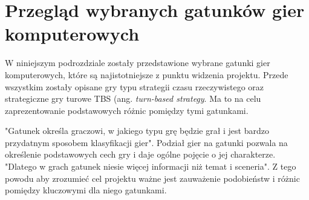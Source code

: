 \section{Przegląd wybranych gatunków gier komputerowych}
W niniejszym podrozdziale zostały przedstawione wybrane gatunki gier komputerowych, które są najistotniejsze z punktu widzenia
projektu. Przede wszystkim zostały opisane gry typu strategii czasu rzeczywistego oraz strategiczne gry turowe TBS (ang.
\textit{turn-based strategy}. Ma to na celu zaprezentowanie podstawowych różnic pomiędzy tymi gatunkami.

"Gatunek określa graczowi, w jakiego typu grę będzie grał i jest bardzo przydatnym sposobem klasyfikacji gier"\cite{practical_game_design}.
Podział gier na gatunki pozwala na określenie podstawowych cech gry i daje ogólne pojęcie o jej charakterze. "Dlatego w
grach gatunek niesie więcej informacji niż temat i sceneria"\cite{practical_game_design}. Z tego powodu aby zrozumieć cel projektu ważne jest zauważenie podobieństw i różnic pomiędzy kluczowymi dla niego gatunkami.





